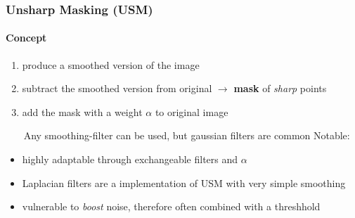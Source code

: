 \begin{frame}
	\frametitle{Unsharp Masking (USM)}
	\framesubtitle{Concept}
	\begin{large}
	\begin{enumerate}
		\item produce a smoothed version of the image
		\item subtract the smoothed version from original \newline $\rightarrow$ \textbf{mask} of \textit{sharp} points
		\item add the mask with a weight $\alpha$ to original image
	\end{enumerate}
\end{large}
~\newline ~\newline  ~\newline  
	Any smoothing-filter can be used, but gaussian filters are common \newline
	Notable:
	\begin{itemize}
		\item highly adaptable through exchangeable filters and $\alpha$
		\item Laplacian filters are a implementation of USM with very simple smoothing
		\item vulnerable to \textit{boost} noise, therefore often combined with a threshhold
	\end{itemize}
\end{frame}
